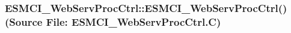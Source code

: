  
\setlength{\oldparskip}{\parskip}
\setlength{\parskip}{1.5ex}
\setlength{\oldparindent}{\parindent}
\setlength{\parindent}{0pt}
\setlength{\oldbaselineskip}{\baselineskip}
\setlength{\baselineskip}{11pt}
 
\def\bv{\begin{verbatim}}
\def\ev{\end{verbatim}}
\def\be{\begin{equation}}
\def\ee{\end{equation}}
\def\bea{\begin{eqnarray}}
\def\eea{\end{eqnarray}}
\def\bi{\begin{itemize}}
\def\ei{\end{itemize}}
\def\bn{\begin{enumerate}}
\def\en{\end{enumerate}}
\def\bd{\begin{description}}
\def\ed{\end{description}}
\def\({\left (}
\def\){\right )}
\def\[{\left [}
\def\]{\right ]}
\def\<{\left  \langle}
\def\>{\right \rangle}
\def\cI{{\cal I}}
\def\diag{\mathop{\rm diag}}
\def\tr{\mathop{\rm tr}}


 
\subsubsection{ESMCI\_WebServProcCtrl::ESMCI\_WebServProcCtrl() (Source File: ESMCI\_WebServProcCtrl.C)}


